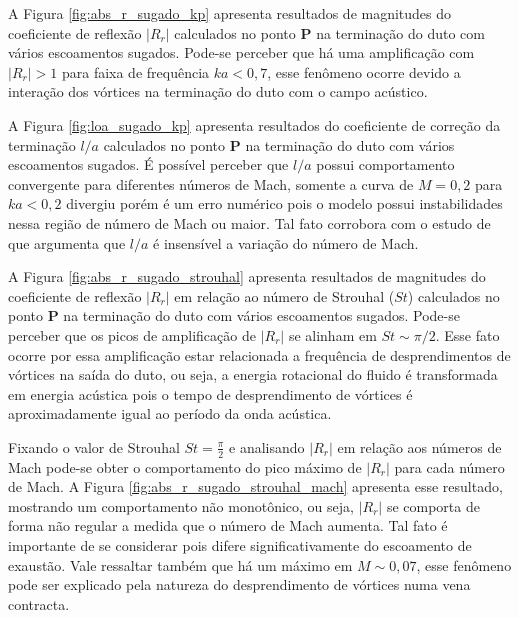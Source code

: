 A Figura \ref{fig:abs_r_sugado_kp} apresenta resultados de magnitudes do coeficiente de reflexão $|R_{r}|$ calculados no ponto $\textbf{P}$ na terminação do duto com vários escoamentos sugados. Pode-se perceber que há uma amplificação com $|R_{r}| > 1$ para faixa de frequência $ka < 0,7$, esse fenômeno ocorre devido a interação dos vórtices na terminação do duto com o campo acústico.

A Figura \ref{fig:loa_sugado_kp} apresenta resultados do coeficiente de correção da terminação $l/a$ calculados no ponto $\textbf{P}$ na terminação do duto com vários escoamentos sugados. É possível perceber que $l/a$ possui comportamento convergente para diferentes números de Mach, somente a curva de $M = 0,2$ para $ka < 0,2$ divergiu porém é um erro numérico pois o modelo possui instabilidades nessa região de número de Mach ou maior. Tal fato corrobora com o estudo de  que argumenta que $l/a$ é insensível a variação do número de Mach.  

\newpage
\begin{figure}[ht!]
  \centering
  
\end{figure}

\begin{figure}[ht!]
\centering
  
\end{figure}

 A Figura \ref{fig:abs_r_sugado_strouhal} apresenta resultados de magnitudes do coeficiente de reflexão $|R_{r}|$ em relação ao número de Strouhal ($St$) calculados no ponto $\textbf{P}$ na terminação do duto com vários escoamentos sugados. Pode-se perceber que os picos de amplificação de $|R_{r}|$ se alinham em $St \sim \pi/2$. Esse fato ocorre por essa amplificação estar relacionada a frequência de desprendimentos de vórtices na saída do duto, ou seja, a energia rotacional do fluido é transformada em energia acústica pois o tempo de desprendimento de vórtices é aproximadamente igual ao período da onda acústica. 


Fixando o valor de Strouhal $St = \frac{\pi}{2}$ e analisando $|R_{r}|$ em relação aos números de Mach pode-se obter o comportamento do pico máximo de $|R_{r}|$ para cada número de Mach. A Figura \ref{fig:abs_r_sugado_strouhal_mach} apresenta esse resultado, mostrando um comportamento não monotônico, ou seja, $|R_{r}|$ se comporta de forma não regular a medida que o número de Mach aumenta. Tal fato é importante de se considerar pois difere significativamente do escoamento de exaustão. Vale ressaltar também que há um máximo em $M \sim 0,07$, esse fenômeno pode ser explicado pela natureza do desprendimento de vórtices numa vena contracta.


\begin{figure}[ht!]
\centering
  
\end{figure}




